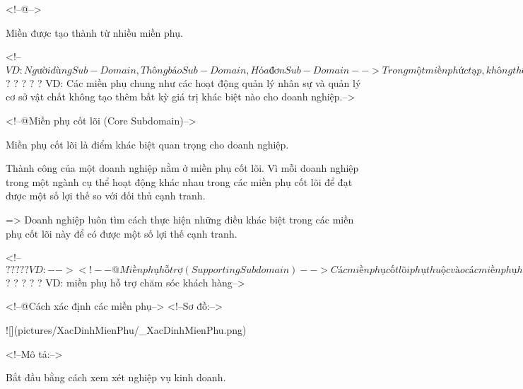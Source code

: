 
<!--@-->

Miền được tạo thành từ nhiều miền phụ.

<!--$VD: Người dùng Sub-Domain, Thông báo Sub-Domain, Hóa đơn Sub-Domain-->

Trong một miền phức tạp, không thể có một chuyên gia ngành có kiến thức về tất cả các miền phụ.
Việc xác định các miền phụ liên quan đến việc chia nhỏ các khả năng kinh doanh thành các đơn vị kinh doanh gắn kết.

<!--@Phân loại các miền phụ-->

Có 3 loại miền phụ:

<!--@Miền phụ chung (Generic Subdomain)-->

Miền phụ chung cung cấp các giải pháp có sẵn mà doanh nghiệp có thể mua.
Doanh nghiệp không thể đạt được bất kỳ lợi thế cạnh tranh nào bằng cách thực hiện những điều khác biệt trong miền phụ chung.

<!--$? ? ? ? ? VD: Các miền phụ chung như các hoạt động quản lý nhân sự và quản lý cơ sở vật chất không tạo thêm bất kỳ giá trị khác biệt nào cho doanh nghiệp.-->

<!--@Miền phụ cốt lõi (Core Subdomain)-->

Miền phụ cốt lõi là điểm khác biệt quan trọng cho doanh nghiệp.

Thành công của một doanh nghiệp nằm ở miền phụ cốt lõi. Vì mỗi doanh nghiệp trong một ngành cụ thể hoạt động khác nhau trong các miền phụ cốt lõi để đạt được một số lợi thế so với đối thủ cạnh tranh.

=> Doanh nghiệp luôn tìm cách thực hiện những điều khác biệt trong các miền phụ cốt lõi này để có được một số lợi thế cạnh tranh.

<!--$? ? ? ? ? VD:-->

<!--@Miền phụ hỗ trợ (Supporting Subdomain)-->

Các miền phụ cốt lõi phụ thuộc vào các miền phụ hỗ trợ.

Miền phụ hỗ trợ cung cấp các dịch vụ để miền phụ cốt lõi hoạt động hiệu quả.

Miền phụ hỗ trợ không có mức độ phức tạp cao về logic nghiệp vụ.

<!--$? ? ? ? ? VD: miền phụ hỗ trợ chăm sóc khách hàng-->

<!--@Cách xác định các miền phụ-->
<!--Sơ đồ:-->

![](pictures/XacDinhMienPhu/_XacDinhMienPhu.png)

<!--Mô tả:-->

Bắt đầu bằng cách xem xét nghiệp vụ kinh doanh.

